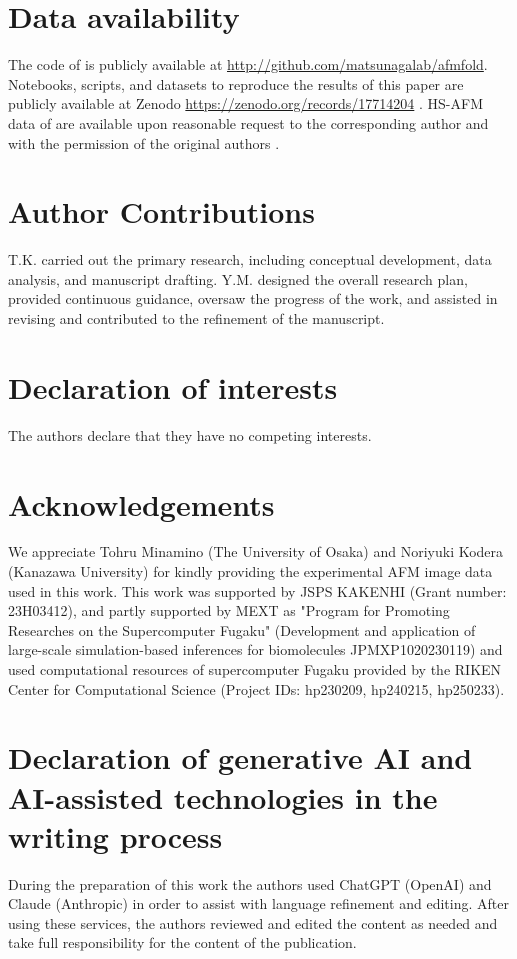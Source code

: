 \section{Data availability}
The code of \Model is publicly available at \url{http://github.com/matsunagalab/afmfold}.
Notebooks, scripts, and datasets to reproduce the results of this paper are publicly available at Zenodo \url{https://zenodo.org/records/17714204} \cite{kawai_dataset_nodate}. 
HS-AFM data of \flhac are available upon reasonable request to the corresponding author and with the permission of the original authors \cite{inoue_structural_2019}. 

\section{Author Contributions}
T.K. carried out the primary research, including conceptual development, data analysis, and manuscript drafting.
Y.M. designed the overall research plan, provided continuous guidance, oversaw the progress of the work, and assisted in revising and contributed to the refinement of the manuscript.

\section{Declaration of interests}
The authors declare that they have no competing interests.

\section{Acknowledgements}
We appreciate Tohru Minamino (The University of Osaka) and Noriyuki Kodera (Kanazawa University) for kindly providing the experimental AFM image data used in this work. 
This work was supported by JSPS KAKENHI (Grant number: 23H03412), and partly supported by MEXT as "Program for Promoting Researches on the Supercomputer Fugaku" (Development and application of large-scale simulation-based inferences for biomolecules JPMXP1020230119) and used computational resources of supercomputer Fugaku provided by the RIKEN Center for Computational Science (Project IDs: hp230209, hp240215, hp250233). 

\section{Declaration of generative AI and AI-assisted technologies in the writing process}
During the preparation of this work the authors used ChatGPT (OpenAI) and Claude (Anthropic) in order to assist with language refinement and editing.
After using these services, the authors reviewed and edited the content as needed and take full responsibility for the content of the publication.
